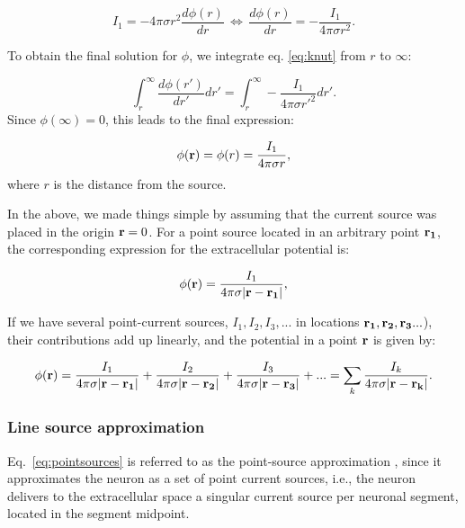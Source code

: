 \begin{equation}
I_1 = -4\pi \sigma r^2  \frac{d\phi(r)}{dr} \, \iff \, \frac{d\phi(r)}{dr} = -\frac{I_1}{4\pi \sigma r^2 }.
\label{eq:knut}
\end{equation}

To obtain the final solution for $\phi$, we integrate eq. \ref{eq:knut} from $r$ to $\infty$:

\begin{equation}
\int_r^{\infty} \frac{d\phi(r')}{dr'} dr' = \int_r^{\infty} -\frac{I_1}{4\pi \sigma r'^2 } dr'.
\label{eq:knut2}
\end{equation}
Since $\phi({\infty}) = 0$, this leads to the final expression:

\begin{equation}
\phi({\bf r}) = \phi(r) = \frac{I_1}{4\pi \sigma r},
\label{eq:pointsource}
\end{equation}
where $r$ is the distance from the source.

In the above, we made things simple by assuming that the current source was placed in the origin ${\bf r} = 0$. For a point source located in an arbitrary point ${\bf r_1} $, the corresponding expression for the extracellular potential is:

\begin{equation}
\phi({\bf r}) = \frac{I_1}{4\pi \sigma |{\bf r-r_1}|},
\label{eq:pointsource2}
\end{equation}

If we have several point-current sources, $I_{1}, I_2, I_3, ... $ in locations ${\bf r_1}, {\bf r_2}, {\bf r_3} ... $), their contributions add up linearly, and the potential in a point ${\bf r}$ is given by:

\begin{equation}
\phi({\bf r}) = \frac{I_1}{4\pi  \sigma {\bf |r-r_1|}} + \frac{I_2}{4\pi  \sigma {\bf |r-r_2|} } + \frac{I_3}{4\pi  \sigma {\bf |r-r_3|} } + ... = \sum_k \frac{I_k}{4\pi  \sigma {\bf |r-r_k|} }.
\label{eq:pointsources}
\end{equation}


\subsubsection{Line source approximation}
Eq.~\ref{eq:pointsources} is referred to as the point-source approximation \citep{Holt1999, Pettersen2008a}, since it approximates the neuron as a set of point current sources, i.e., the neuron delivers to the extracellular space a singular current source per neuronal segment, located in the segment midpoint. 

